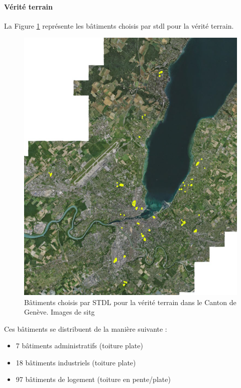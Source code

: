 \paragraph{Vérité terrain}
\par{La Figure \ref{fig:stdl_02_verite_terrain} représente les bâtiments choisis par \acrshort{stdl} pour la vérité terrain.}
\begin{figure}[H]
    \centering
    \includegraphics[width=1\linewidth]{02-main//figures/ch2/stdl_02_verite_terrain.png}
    \caption{Bâtiments choisis par STDL pour la vérité terrain dans le Canton de Genève. Images de \acrshort{sitg}}
    \label{fig:stdl_02_verite_terrain}
\end{figure}
\par{Ces bâtiments se distribuent de la manière suivante :}
\begin{itemize}
    \item 7 bâtiments administratifs (toiture plate)
    \item 18 bâtiments industriels (toiture plate)
    \item 97 bâtiments de logement (toiture en pente/plate)
\end{itemize}
